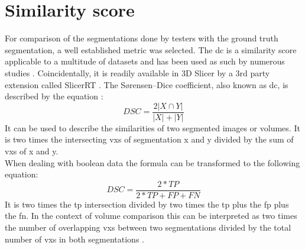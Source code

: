 \section{Similarity score}\label{s:similarity-score}
For comparison of the segmentations done by testers with the ground truth segmentation, a well established metric was selected.
The \acrfull{dc} is a similarity score applicable to a multitude of datasets and has been used as such by numerous studies \cite{setiawanImageSegmentationMetrics2020,atasPerformanceEvaluationJaccardDice2023}.
Coincidentally, it is readily available in 3D Slicer by a 3rd party extension called SlicerRT \cite{pinterSlicerRTRadiationTherapy2012}.
The S\o{}rensen–Dice coefficient, also known as \acrfull{dc}, is described by the equation \cite{diceMeasuresAmountEcologic1945}:\\
\begin{equation}\label{eqn:dice-coefficient}
	DSC=\frac{2|X\cap Y|}{|X|+|Y|}
\end{equation}
\newline
\noindent
It can be used to describe the similarities of two segmented images or volumes.
It is two times the intersecting \glspl{vx} of segmentation x and y divided by the sum of \glspl{vx} of x and y.\\
When dealing with boolean data the formula can be transformed to the following equation:\\
\begin{equation}\label{eqn:binary-dice-coefficient}
	DSC=\frac{2*TP}{2*TP+FP+FN}
\end{equation}
\newline
\noindent
It is two times the \acrfull{tp} intersection divided by two times the \acrlong{tp} plus the \acrfull{fp} plus the \acrfull{fn}.
In the context of volume comparison this can be interpreted as two times the number of overlapping \glspl{vx} between two segmentations divided by the total number of \glspl{vx} in both segmentations \cite{schelbComparisonProstateMRI2021}.


